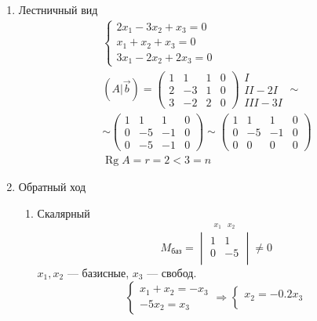 \documentclass{article}
\DeclareMathOperator*{\Rg}{Rg}
\begin{document}
\begin{enumerate}
	\item Лестничный вид
	\begin{gather*}
		\begin{cases}
			2x_1 - 3x_2 + x_3 = 0 \\
			x_1 + x_2 + x_3 = 0 \\
			3x_1 - 2x_2 + 2x_3 = 0
		\end{cases} \\
		(A | \vec{b}) = \begin{pmatrix}
			1 & 1 & 1 & 0 \\
			2 & -3 & 1 & 0 \\
			3 & -2 & 2 & 0
		\end{pmatrix} \begin{matrix}
			I \\ II - 2I \\ III - 3I
		\end{matrix} \sim \\
		\sim \begin{pmatrix}
			1 & 1 & 1 & 0 \\
			0 & -5 & -1 & 0 \\
			0 & -5 & -1 & 0
		\end{pmatrix} \sim
		\begin{pmatrix}
			1 & 1 & 1 & 0 \\
			0 & -5 & -1 & 0 \\
			0 & 0 & 0 & 0
		\end{pmatrix} \\
		\Rg{A} = r = 2 < 3 = n
	\end{gather*}
	\item Обратный ход
	\begin{enumerate}
		\item Скалярный
		\[
			M_{\text{баз}} = \stackrel{\begin{matrix}
				x_1 & x_2
			\end{matrix}}{\begin{vmatrix}
				1 & 1 \\
				0 & -5 \\
			\end{vmatrix}} \ne 0
		\]
		$x_1, x_2$ --- базисные, $x_3$ --- свобод. \\
		\[
		\begin{cases}
			x_1 + x_2 = -x_3 \\
			-5x_2 = x_3
		\end{cases} \Rightarrow \begin{cases}
			x_2 = -0.2x_3 \\

\end{cases}\]
\end{enumerate}
\end{enumerate}
\end{document}
